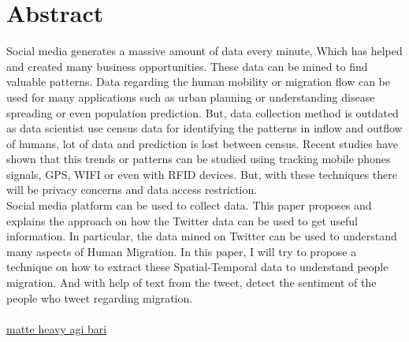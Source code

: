 \chapter*{Abstract}
Social media generates a massive amount of data every minute, Which has helped and created
many business opportunities. These data can be mined to find valuable patterns. Data regarding
the human mobility or migration flow can be used for many applications such as urban planning
or understanding disease spreading or even population prediction. But, data collection method
is outdated as data scientist use census data for identifying the patterns in inflow and outflow
of humans, lot of data and prediction is lost between census. Recent studies have shown that
this trends or patterns can be studied using tracking mobile phones signals, GPS, WIFI or even
with RFID devices. But, with these techniques there will be privacy concerns and data access
restriction. 
\\
Social media platform can be used to collect data. This paper proposes and explains the approach on how the Twitter data can be used to get useful information. In particular, the data mined on Twitter can be used to understand many aspects of Human Migration. In this paper, I will try to propose a technique on how to extract these Spatial-Temporal data to understand people migration. And with help of text from the tweet, detect the sentiment of the people who tweet regarding migration.
\\
\\
\underline{matte heavy agi bari}